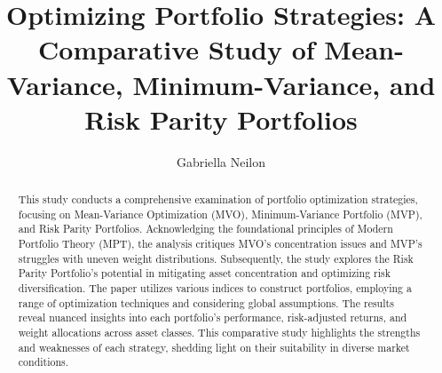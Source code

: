 \documentclass[12pt,preprint, authoryear]{elsarticle}
\numberwithin{equation}{section}
\numberwithin{figure}{section}
\numberwithin{table}{section}
\begin{document}
\begin{frontmatter}  %

\title{Optimizing Portfolio Strategies: A Comparative Study of
Mean-Variance, Minimum-Variance, and Risk Parity Portfolios}





\author[Add1]{Gabriella Neilon}





\address[Add1]{Stellenbosch University}


\begin{abstract}
\small{
This study conducts a comprehensive examination of portfolio
optimization strategies, focusing on Mean-Variance Optimization (MVO),
Minimum-Variance Portfolio (MVP), and Risk Parity Portfolios.
Acknowledging the foundational principles of Modern Portfolio Theory
(MPT), the analysis critiques MVO's concentration issues and MVP's
struggles with uneven weight distributions. Subsequently, the study
explores the Risk Parity Portfolio's potential in mitigating asset
concentration and optimizing risk diversification. The paper utilizes
various indices to construct portfolios, employing a range of
optimization techniques and considering global assumptions. The results
reveal nuanced insights into each portfolio's performance, risk-adjusted
returns, and weight allocations across asset classes. This comparative
study highlights the strengths and weaknesses of each strategy, shedding
light on their suitability in diverse market conditions.
}
\end{abstract}

\vspace{1cm}





\vspace{0.5cm}

\end{frontmatter}

\setcounter{footnote}{0}


\renewcommand{\contentsname}{Table of Contents}
{\tableofcontents}

\pagestyle{fancy}
\chead{}
\rhead{}
\lfoot{}
\lhead{}
\cfoot{}
\end{document}
